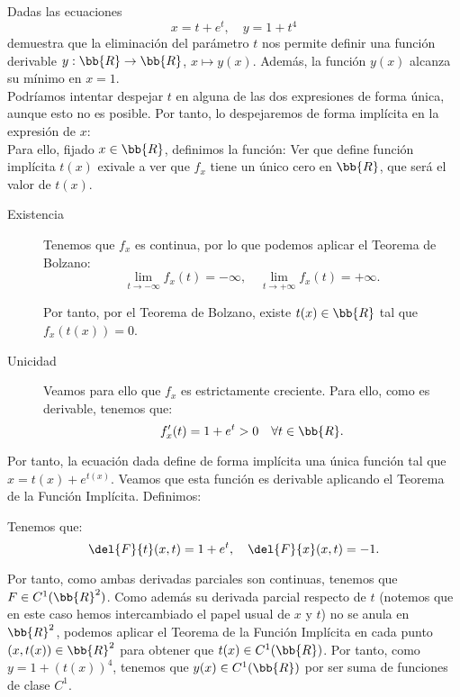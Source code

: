 \documentclass[12pt]{article}
\begin{document}
\begin{ejercicio}
    Dadas las ecuaciones
    \[
        x = t + e^t, \quad y = 1 + t^4
    \]
    demuestra que la eliminación del parámetro \(t\) nos permite definir una función derivable \(y : \bb{R} \to \bb{R}\), \(x \mapsto y(x)\). Además, la función \(y(x)\) alcanza su mínimo en \(x = 1\).\\

    Podríamos intentar despejar $t$ en alguna de las dos expresiones de forma única, aunque esto no es posible. Por tanto, lo despejaremos de forma implícita en la expresión de $x$:\\
    
    Para ello, fijado $x\in \bb{R}$, definimos la función:
    Ver que define función implícita $t(x)$ exivale a ver que $f_x$ tiene un único cero en $\bb{R}$, que será el valor de $t(x)$.
    \begin{description}
        \item[Existencia] Tenemos que $f_x$ es continua, por lo que podemos aplicar el Teorema de Bolzano:
        \begin{equation*}
            \lim_{t\to -\infty} f_x(t) = -\infty, \quad \lim_{t\to +\infty} f_x(t) = +\infty.
        \end{equation*}

        Por tanto, por el Teorema de Bolzano, existe $t(x)\in \bb{R}$ tal que $f_x(t(x)) = 0$.

        \item[Unicidad] Veamos para ello que $f_x$ es estrictamente creciente. Para ello, como es derivable, tenemos que:
        \begin{equation*}
            f_x'(t) = 1 + e^t > 0 \quad \forall t\in \bb{R}.
        \end{equation*}
    \end{description}

    Por tanto, la ecuación dada define de forma implícita una única función
    tal que $x=t(x)+e^{t(x)}$. Veamos que esta función es derivable aplicando el Teorema de la Función Implícita. Definimos:

    Tenemos que:
    \begin{equation*}
        \del{F}{t}(x,t) = 1+e^t, \quad \del{F}{x}(x,t) = -1.
    \end{equation*}

    Por tanto, como ambas derivadas parciales son continuas, tenemos que $F\in C^1(\bb{R}^2)$. Como además su derivada parcial respecto de $t$ (notemos que en este caso hemos intercambiado el papel usual de $x$ y $t$) no se anula en $\bb{R}^2$,
    podemos aplicar el Teorema de la Función Implícita en cada punto $(x,t(x))\in \bb{R}^2$ para obtener que $t(x)\in C^1(\bb{R})$.
    Por tanto, como $y=1+(t(x))^4$, tenemos que $y(x)\in C^1(\bb{R})$ por ser suma de funciones de clase $C^1$.\\


\end{ejercicio}
\end{document}
